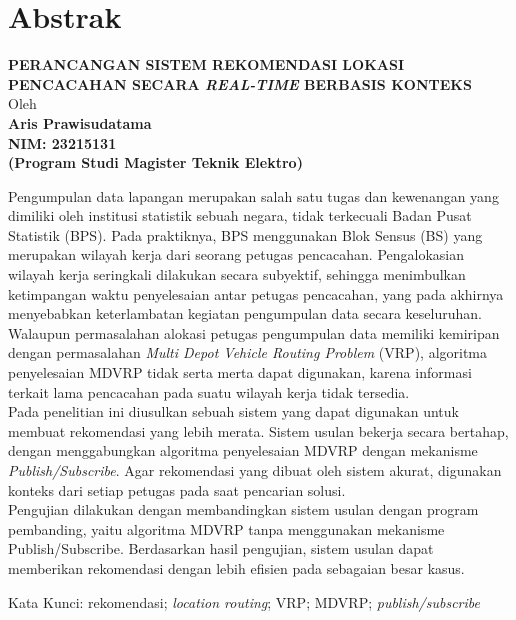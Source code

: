 %
%
%

\chapter*{Abstrak}

\vspace*{0.2cm}

\begin{center}
	{\large \textbf{PERANCANGAN SISTEM REKOMENDASI LOKASI PENCACAHAN SECARA \textit{REAL-TIME} BERBASIS KONTEKS}} \\
	\vspace*{0.2cm}
	Oleh \\
	{\large \textbf{Aris Prawisudatama}} \\
	{\large \textbf{NIM: 23215131}} \\
	{\large \textbf{(Program Studi Magister Teknik Elektro)}}
\end{center}


\vspace*{0.5cm}

\noindent Pengumpulan data lapangan merupakan salah satu tugas dan kewenangan yang dimiliki oleh institusi statistik sebuah negara, tidak terkecuali Badan Pusat Statistik (BPS). Pada praktiknya, BPS menggunakan Blok Sensus (BS) yang merupakan wilayah kerja dari seorang petugas pencacahan. Pengalokasian wilayah kerja seringkali dilakukan secara subyektif, sehingga menimbulkan ketimpangan waktu penyelesaian antar petugas pencacahan, yang pada akhirnya menyebabkan keterlambatan kegiatan pengumpulan data secara keseluruhan. Walaupun permasalahan alokasi petugas pengumpulan data memiliki kemiripan dengan permasalahan \textit{Multi Depot Vehicle Routing Problem} (VRP), algoritma penyelesaian MDVRP tidak serta merta dapat digunakan, karena informasi terkait lama pencacahan pada suatu wilayah kerja tidak tersedia. \\

\noindent Pada penelitian ini diusulkan sebuah sistem yang dapat digunakan untuk membuat rekomendasi yang lebih merata. Sistem usulan bekerja secara bertahap, dengan menggabungkan algoritma penyelesaian MDVRP dengan mekanisme \textit{Publish/Subscribe}. Agar rekomendasi yang dibuat oleh sistem akurat, digunakan konteks dari setiap petugas pada saat pencarian solusi. \\

\noindent Pengujian dilakukan dengan membandingkan sistem usulan dengan program pembanding, yaitu algoritma MDVRP tanpa menggunakan mekanisme Publish/Subscribe. Berdasarkan hasil pengujian, sistem usulan dapat memberikan rekomendasi dengan lebih efisien pada sebagaian besar kasus.  \\

\vspace*{0.2cm}

\noindent Kata Kunci: rekomendasi; \textit{location routing}; VRP; MDVRP; \textit{publish/subscribe} \\

\newpage